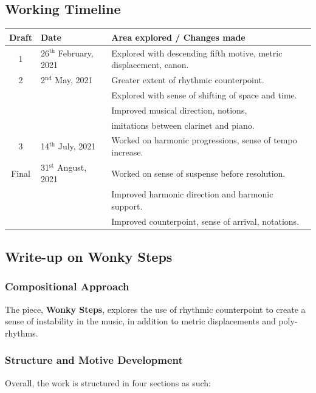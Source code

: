 \documentclass{article}
\begin{document}
\newpage

\subsection{Working Timeline}
\begin{center}
	\def\arraystretch{1.5}
\begin{tabular}{|c|l|l|}
	\hline
	Draft&Date&Area explored / Changes made\\
	\hline
	1&26\(^{\text{th}}\) February, 2021&
    Explored with descending fifth motive, metric displacement, canon.\\
	\hline
    2&2\(^{\text{nd}}\) May, 2021&Greater extent of rhythmic counterpoint.\\
    &&Explored with sense of shifting of space and time.\\
    &&Improved musical direction, notions,\\
    &&imitations between clarinet and piano.\\
	\hline
	3&14\(^{\text{th}}\) July, 2021&Worked on harmonic progressions, sense of tempo increase.\\
	\hline
	Final&31\(^{\text{st}}\) Angust, 2021
    &Worked on sense of suspense before resolution.\\
    &&Improved harmonic direction and harmonic support.\\
    &&Improved counterpoint, sense of arrival, notations.\\
	\hline
\end{tabular}
\end{center}

\subsection{Write-up on {\bf Wonky Steps}}

\subsubsection{Compositional Approach}
The piece, {\bf Wonky Steps}, explores the use of rhythmic counterpoint to
create a sense of instability in the music, in addition to metric displacements
and poly-rhythms.\\

\subsubsection{Structure and Motive Development}
Overall, the work is structured in four sections as such:\\
\end{document}
